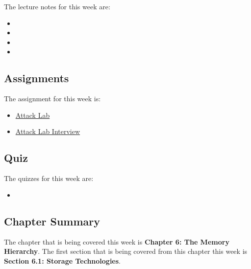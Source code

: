 \noindent The lecture notes for this week are:

\begin{itemize}
    \item {}
    \item {}
    \item {}
    \item {}
\end{itemize}

\subsection{Assignments}

The assignment for this week is:

\begin{itemize}
    \item \href{https://github.com/QuantumCompiler/CU/tree/main/CSPB%202400%20-%20Computer%20Systems/Assignments/Assignment%203%20-%20Attack%20Lab}{Attack Lab}
    \item \href{https://github.com/QuantumCompiler/CU/tree/main/CSPB%202400%20-%20Computer%20Systems/Assignments/Assignment%203%20-%20Attack%20Lab}{Attack Lab Interview}
\end{itemize}

\subsection{Quiz}

The quizzes for this week are:

\begin{itemize}
    \item {}
\end{itemize}

\newpage

\subsection{Chapter Summary}

The chapter that is being covered this week is \textbf{Chapter 6: The Memory Hierarchy}. The first section that is being covered from this chapter this week is \textbf{Section 6.1: Storage Technologies}.

